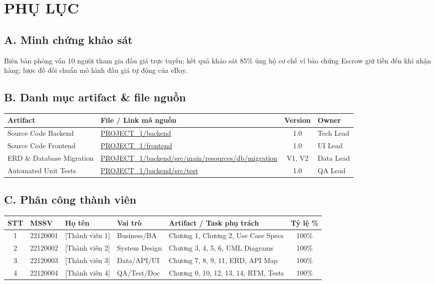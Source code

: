 \documentclass[11pt,a4paper]{article}
\begin{document}
\section*{PHỤ LỤC}

\subsection*{A. Minh chứng khảo sát}
Biên bản phỏng vấn 10 người tham gia đấu giá trực tuyến; kết quả khảo sát 85\% ủng hộ cơ chế ví bảo chứng Escrow giữ tiền đến khi nhận hàng; lược đồ đối chuẩn mô hình đấu giá tự động của eBay.

\subsection*{B. Danh mục artifact \& file nguồn}
\begin{table}[H]
    \centering
    \small
    \begin{tabularx}{\textwidth}{|l|X|c|l|}
        \hline
        \textbf{Artifact} & \textbf{File / Link mã nguồn} & \textbf{Version} & \textbf{Owner} \\ \hline
        Source Code Backend & \url{PROJECT_1/backend} & 1.0 & Tech Lead \\ \hline
        Source Code Frontend & \url{PROJECT_1/frontend} & 1.0 & UI Lead \\ \hline
        ERD \& Database Migration & \url{PROJECT_1/backend/src/main/resources/db/migration} & V1, V2 & Data Lead \\ \hline
        Automated Unit Tests & \url{PROJECT_1/backend/src/test} & 1.0 & QA Lead \\ \hline
    \end{tabularx}
\end{table}

\subsection*{C. Phân công thành viên}
\begin{table}[H]
    \centering
    \small
    \begin{tabularx}{\textwidth}{|c|l|l|l|X|c|}
        \hline
        \textbf{STT} & \textbf{MSSV} & \textbf{Họ tên} & \textbf{Vai trò} & \textbf{Artifact / Task phụ trách} & \textbf{Tỷ lệ \%} \\ \hline
        1 & 22120001 & [Thành viên 1] & Business/BA & Chương 1, Chương 2, Use Case Specs & 100\% \\ \hline
        2 & 22120002 & [Thành viên 2] & System Design & Chương 3, 4, 5, 6, UML Diagrams & 100\% \\ \hline
        3 & 22120003 & [Thành viên 3] & Data/API/UI & Chương 7, 8, 9, 11, ERD, API Map & 100\% \\ \hline
        4 & 22120004 & [Thành viên 4] & QA/Test/Doc & Chương 0, 10, 12, 13, 14, RTM, Tests & 100\% \\ \hline
    \end{tabularx}
\end{table}
\end{document}
